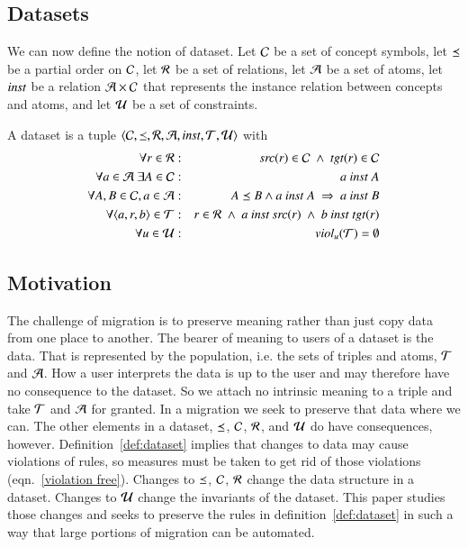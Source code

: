 \documentclass{elsarticle}
\begin{document}
\subsection{Datasets}
	We can now define the notion of dataset.
	Let	$\mathcal{C}$ be a set of concept symbols,
	let $\preceq$ be a partial order on $\mathcal{C}$,
	let $\mathcal{R}$ be a set of relations,
	let $\mathcal{A}$ be a set of atoms,
	let $\text{\it inst\/}$ be a relation $\mathcal{A}\times\mathcal{C}$ that represents the instance relation between concepts and atoms,
	and let $\mathcal{U}$ be a set of constraints.
\begin{definition}[dataset]
	\label{def:dataset}
	\item A dataset is a tuple $\langle\mathcal{C},\preceq,\mathcal{R},\mathcal{A},\text{\it inst\/},\mathcal{T},\mathcal{U}\rangle$ with
	\begin{eqnarray}
		\forall r\in\mathcal{R}&:&\text{\it src\/}(r)\in\mathcal{C}\ \wedge\ \text{\it tgt\/}(r)\in\mathcal{C}\\
		\forall a\in\mathcal{A}\ \exists A\in\mathcal{C}&:&a\ \text{\it inst\/}\ A\\
		\forall A,B\in\mathcal{C}, a\in\mathcal{A}&:&A\preceq B\wedge a\ \text{\it inst\/}\ A\ \Rightarrow\ a\ \text{\it inst\/}\ B\\
		\forall\langle{a},{r},{b}\rangle\in\mathcal{T}&:&r\in\mathcal{R}\ \wedge\ a\ \text{\it inst\/}\ \text{\it src\/}(r)\ \wedge\ b\ \text{\it inst\/}\ \text{\it tgt\/}(r)\\
		\forall u\in\mathcal{U}&:&\text{\it viol\/}_{u}(\mathcal{T})=\emptyset\label{violation free}
	\end{eqnarray}
\end{definition}

\subsection{Motivation}
	The challenge of migration is to preserve meaning rather than just copy data from one place to another.
	The bearer of meaning to users of a dataset is the data.
	That is represented by the population, i.e. the sets of triples and atoms, $\mathcal{T}$ and $\mathcal{A}$.
	How a user interprets the data is up to the user and may therefore have no consequence to the dataset.
	So we attach no intrinsic meaning to a triple and take $\mathcal{T}$ and $\mathcal{A}$ for granted.
	In a migration we seek to preserve that data where we can.
	The other elements in a dataset, $\preceq$, $\mathcal{C}$, $\mathcal{R}$, and $\mathcal{U}$ do have consequences, however.
	Definition~\ref{def:dataset} implies that changes to data may cause violations of rules,
	so measures must be taken to get rid of those violations (eqn.~\ref{violation free}).
	Changes to $\preceq$, $\mathcal{C}$, $\mathcal{R}$ change the data structure in a dataset.
	Changes to $\mathcal{U}$ change the invariants of the dataset.
	This paper studies those changes and seeks to preserve the rules in definition~\ref{def:dataset} in such a way that large portions of migration can be automated.
\end{document}
